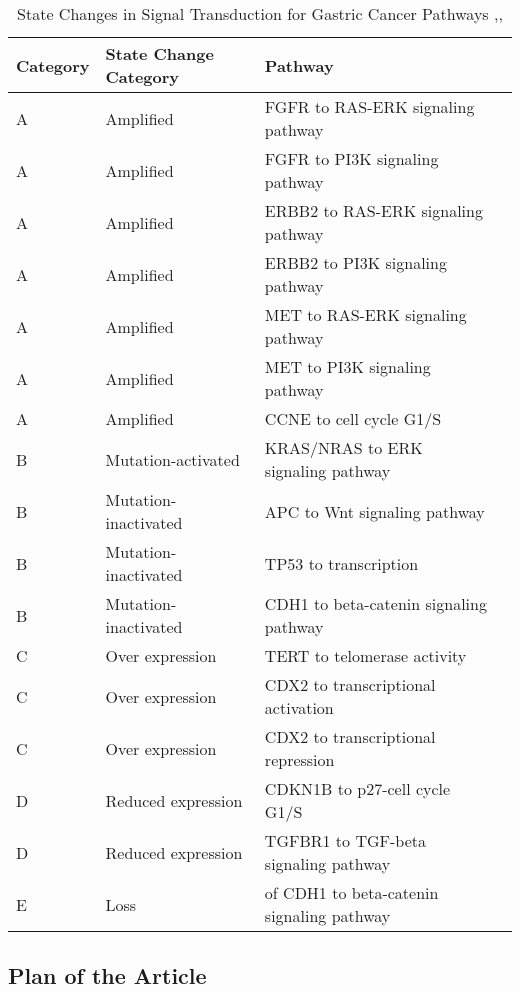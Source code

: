 \begin{table}[H]\tiny
	\caption{State Changes in Signal Transduction for Gastric Cancer Pathways \cite{key400},\cite{key401},\cite{key402}}	
	\begin{tabular}{p{1cm}p{2cm}p{4cm}p{0.1cm}}
		\hline	
		Category &State Change Category & Pathway &  \\
		\hline
		A & Amplified & FGFR to RAS-ERK signaling pathway &  \\
		A & Amplified & FGFR to PI3K signaling pathway &  \\
		A & Amplified & ERBB2 to RAS-ERK signaling pathway &  \\
		A & Amplified & ERBB2 to PI3K signaling pathway &  \\
		A & Amplified & MET to RAS-ERK signaling pathway &  \\
		A & Amplified & MET to PI3K signaling pathway &  \\
		A & Amplified & CCNE to cell cycle G1/S &  \\
		\hline
		B & Mutation-activated & KRAS/NRAS to ERK signaling pathway &  \\
		B & Mutation-inactivated & APC to Wnt signaling pathway &  \\
		B & Mutation-inactivated & TP53 to transcription &  \\
		B & Mutation-inactivated & CDH1 to beta-catenin signaling pathway &  \\
		\hline
		C & Over expression & TERT to telomerase activity &  \\
		C & Over expression & CDX2 to transcriptional activation &  \\
		C & Over expression & CDX2 to transcriptional repression &  \\
		\hline
		D & Reduced expression & CDKN1B to p27-cell cycle G1/S &  \\
		D & Reduced expression & TGFBR1 to TGF-beta signaling pathway &  \\
		E & Loss & of CDH1 to beta-catenin signaling pathway &  \\
		\hline 
	\end{tabular}
\end{table}

\subsection{Plan of the Article}

\begin{enumerate}
\end{enumerate}



